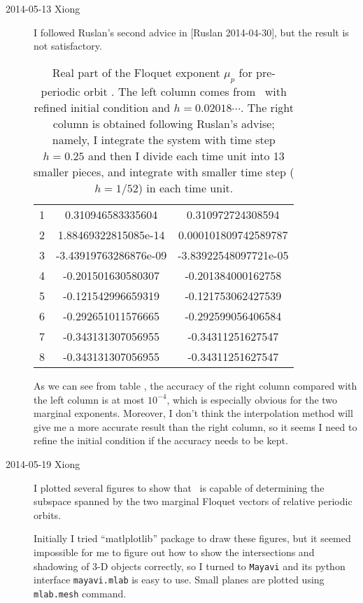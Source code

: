 \begin{description}
\item[2014-05-13 Xiong]
I followed Ruslan's second advice in [Ruslan 2014-04-30], but the
result is not satisfactory.
\begin{table}[h]
  \centering
  \begin{tabular}{c|c|c|}
    \hline
   1 & 0.310946583335604      &   0.310972724308594     \\
   2 & 1.88469322815085e-14   &   0.000101809742589787  \\
   3 & -3.43919763286876e-09  &   -3.83922548097721e-05 \\
   4 & -0.201501630580307     &   -0.201384000162758    \\
   5 & -0.121542996659319     &   -0.121753062427539    \\
   6 & -0.292651011576665     &   -0.292599056406584    \\
   7 & -0.343131307056955     &    -0.34311251627547    \\
   8 & -0.343131307056955     &    -0.34311251627547    \\
  \end{tabular}
  \label{tab:comp_divide}
  \caption{Real part of the Floquet exponent $\mu_{p}$ for pre-periodic
 orbit . The left column comes from \psd\ with refined
initial condition and $h=0.02018\cdots$. The right column is obtained
following Ruslan's
advise; namely, I integrate the system with time step $h=0.25$ and then
I divide each time unit into 13 smaller pieces, and integrate with smaller
time step ($h=1/52$) in each time unit.}
\end{table}
As we can see from table , the accuracy of the
right column compared with the left column is at most $10^{-4}$, which
is especially obvious for the two marginal exponents. Moreover, I don't
think the interpolation method will give me a more accurate result than
the right column, so it seems I need to refine the initial condition if
the accuracy needs to be kept.

\item[2014-05-19 Xiong]
I plotted several figures to show that \psd\ is capable of determining
the subspace spanned by the two marginal Floquet vectors of relative
periodic orbits.

Initially I tried ``matlplotlib'' package to draw these figures, but it
seemed impossible for me to figure out how to show the intersections and
shadowing of 3-D objects correctly, so I turned to \texttt{Mayavi} and
 its python
interface \texttt{mayavi.mlab} is easy to use. Small planes are plotted using
\texttt{mlab.mesh} command.


\end{description}
